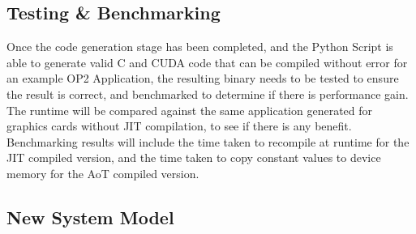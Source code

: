 \subsection{Testing \& Benchmarking}
Once the code generation stage has been completed, and the Python Script is able to generate valid C and CUDA code that can be compiled without error for an example OP2 Application, the resulting binary needs to be tested to ensure the result is correct, and benchmarked to determine if there is performance gain. The runtime will be compared against the same application generated for graphics cards without JIT compilation, to see if there is any benefit. Benchmarking results will include the time taken to recompile at runtime for the JIT compiled version, and the time taken to copy constant values to device memory for the AoT compiled version.

\clearpage
\subsection{New System Model}


